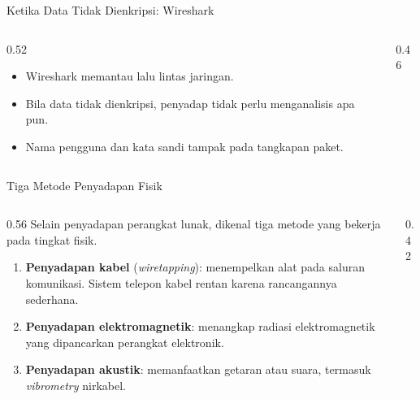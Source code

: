 \documentclass[aspectratio=169,11pt]{beamer}
\begin{document}
\begin{frame}{Ketika Data Tidak Dienkripsi: Wireshark}
    \begin{columns}[T,onlytextwidth]
        \begin{column}{0.52\textwidth}
            \begin{itemize}
                \item Wireshark memantau lalu lintas jaringan.
                \item Bila data tidak dienkripsi, penyadap tidak perlu
                      menganalisis apa pun.
                \item Nama pengguna dan kata sandi tampak pada tangkapan
                      paket.
            \end{itemize}
        \end{column}
        \begin{column}{0.46\textwidth}
            \centering
        \end{column}
    \end{columns}
\end{frame}

\begin{frame}{Tiga Metode Penyadapan Fisik}
    \begin{columns}[T,onlytextwidth]
        \begin{column}{0.56\textwidth}
            \footnotesize
            Selain penyadapan perangkat lunak, dikenal tiga metode yang
            bekerja pada tingkat fisik.
            \begin{enumerate}
                \item \textbf{Penyadapan kabel} (\textit{wiretapping}):
                      menempelkan alat pada saluran komunikasi. Sistem
                      telepon kabel rentan karena rancangannya sederhana.
                \item \textbf{Penyadapan elektromagnetik}: menangkap radiasi
                      elektromagnetik yang dipancarkan perangkat elektronik.
                \item \textbf{Penyadapan akustik}: memanfaatkan getaran atau
                      suara, termasuk \textit{vibrometry} nirkabel.
            \end{enumerate}
        \end{column}
        \begin{column}{0.42\textwidth}
            \centering
        \end{column}
    \end{columns}
\end{frame}
\end{document}
